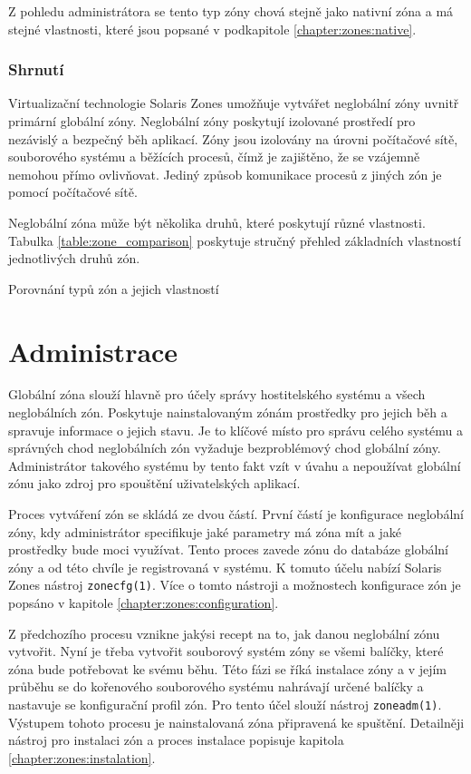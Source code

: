 Z pohledu administrátora se tento typ zóny chová stejně jako nativní zóna a má stejné vlastnosti, které jsou popsané v
podkapitole \ref{chapter:zones:native}.
\subsubsection{Shrnutí}
\label{chapter:zones:summary}
Virtualizační technologie Solaris Zones umožňuje vytvářet neglobální zóny uvnitř primární globální zóny. Neglobální zóny
poskytují izolované prostředí pro nezávislý a bezpečný běh aplikací. Zóny jsou izolovány na úrovni počítačové sítě,
souborového systému a běžících procesů, čímž je zajištěno, že se vzájemně nemohou přímo ovlivňovat. Jediný způsob komunikace
procesů z jiných zón je pomocí počítačové sítě. 

Neglobální zóna může být několika druhů, které poskytují různé vlastnosti. Tabulka \ref{table:zone_comparison} poskytuje stručný
přehled základních vlastností jednotlivých druhů zón.
\begin{table}
  \centering  
  \caption[Porovnání typů zón a jejich vlastností]{Porovnání typů zón a jejich vlastností}
  \label{table:zone_comparison}
\end{table}
\section{Administrace}
\label{chapter:zones:administration}
Globální zóna slouží hlavně pro účely správy hostitelského systému a všech neglobálních zón. Poskytuje nainstalovaným zónám
prostředky pro jejich běh a spravuje informace o jejich stavu. Je to klíčové místo pro správu celého systému a správných chod
neglobálních zón vyžaduje bezproblémový chod globální zóny. Administrátor takového systému by tento fakt vzít v úvahu a
nepoužívat globální zónu jako zdroj pro spouštění uživatelských aplikací.

Proces vytváření zón se skládá ze dvou částí. První částí je konfigurace neglobální zóny, kdy administrátor specifikuje jaké
parametry má zóna mít a jaké prostředky bude moci využívat. Tento proces zavede zónu do databáze globální zóny a od této
chvíle je registrovaná v systému. K tomuto účelu nabízí Solaris Zones nástroj \verb|zonecfg(1)|. Více o tomto nástroji a
možnostech konfigurace zón je popsáno v kapitole \ref{chapter:zones:configuration}.

Z předchozího procesu vznikne jakýsi recept na to, jak danou neglobální zónu vytvořit. Nyní je třeba vytvořit souborový systém
zóny se všemi balíčky, které zóna bude potřebovat ke svému běhu. Této fázi se říká instalace zóny a v jejím průběhu se do
kořenového souborového systému nahrávají určené balíčky a nastavuje se konfigurační profil zón. Pro tento účel slouží nástroj
\verb|zoneadm(1)|. Výstupem tohoto procesu je nainstalovaná zóna připravená ke spuštění. Detailněji nástroj pro instalaci zón
a proces instalace popisuje kapitola \ref{chapter:zones:instalation}.

